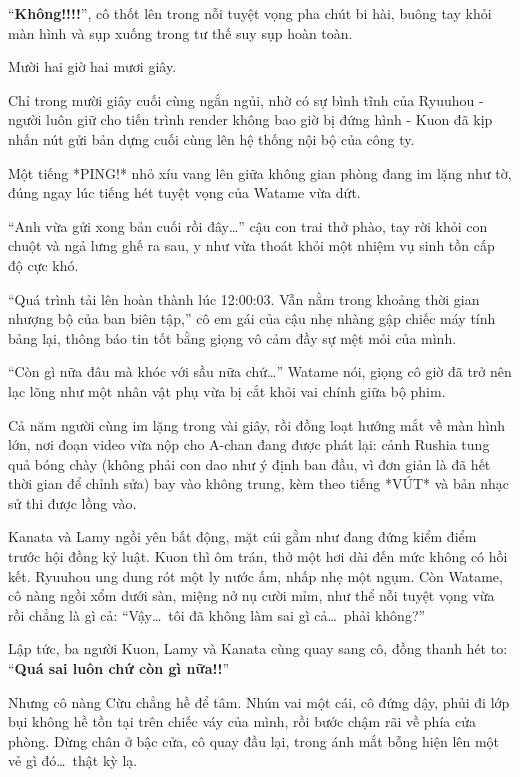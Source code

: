 \documentclass[../main.tex]{subfiles}
\begin{document}
``\textbf{Không!!!!}'', cô thốt lên trong nỗi tuyệt vọng pha chút bi hài, buông tay khỏi màn hình và sụp xuống trong tư thế suy sụp hoàn toàn.

\ct

Mười hai giờ hai mươi giây.

Chỉ trong mười giây cuối cùng ngắn ngủi, nhờ có sự bình tĩnh của Ryuuhou - người luôn giữ cho tiến trình render không bao giờ bị đứng hình - Kuon đã kịp nhấn nút gửi bản dựng cuối cùng lên hệ thống nội bộ của công ty.

Một tiếng *PING!* nhỏ xíu vang lên giữa không gian phòng đang im lặng như tờ, đúng ngay lúc tiếng hét tuyệt vọng của Watame vừa dứt.

``Anh vừa gửi xong bản cuối rồi đây\dots'' cậu con trai thở phào, tay rời khỏi con chuột và ngả lưng ghế ra sau, y như vừa thoát khỏi một nhiệm vụ sinh tồn cấp độ cực khó.

``Quá trình tải lên hoàn thành lúc 12:00:03. Vẫn nằm trong khoảng thời gian nhượng bộ của ban biên tập,'' cô em gái của cậu nhẹ nhàng gập chiếc máy tính bảng lại, thông báo tin tốt bằng giọng vô cảm đầy sự mệt mỏi của mình.

``Còn gì nữa đâu mà khóc với sầu nữa chứ\dots'' Watame nói, giọng cô giờ đã trở nên lạc lõng như một nhân vật phụ vừa bị cắt khỏi vai chính giữa bộ phim.

Cả năm người cùng im lặng trong vài giây, rồi đồng loạt hướng mắt về màn hình lớn, nơi đoạn video vừa nộp cho A-chan đang được phát lại: cảnh Rushia tung quả bóng chày (không phải con dao như ý định ban đầu, vì đơn giản là đã hết thời gian để chỉnh sửa) bay vào không trung, kèm theo tiếng *VÚT* và bản nhạc sử thi được lồng vào.

Kanata và Lamy ngồi yên bất động, mặt cúi gằm như đang đứng kiểm điểm trước hội đồng kỷ luật. Kuon thì ôm trán, thở một hơi dài đến mức không có hồi kết. Ryuuhou ung dung rót một ly nước ấm, nhấp nhẹ một ngụm. Còn Watame, cô nàng ngồi xổm dưới sàn, miệng nở nụ cười mỉm, như thể nỗi tuyệt vọng vừa rồi chẳng là gì cả: ``Vậy\dots\ tôi đã không làm sai gì cả\dots\ phải không?''

Lập tức, ba người Kuon, Lamy và Kanata cùng quay sang cô, đồng thanh hét to: ``\textbf{Quá sai luôn chứ còn gì nữa!!}''


Nhưng cô nàng Cừu chẳng hề để tâm. Nhún vai một cái, cô đứng dậy, phủi đi lớp bụi không hề tồn tại trên chiếc váy của mình, rồi bước chậm rãi về phía cửa phòng. Dừng chân ở bậc cửa, cô quay đầu lại, trong ánh mắt bỗng hiện lên một vẻ gì đó\dots\ thật kỳ lạ.
\end{document}
